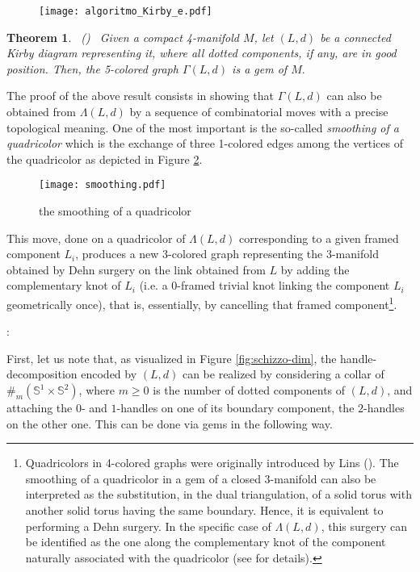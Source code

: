 \documentclass[12pt,a4paper]{article}
\newtheorem{theorem}[lemma]{Theorem}
\newcommand{\G}{\Gamma}
\begin{document}
\begin{figure} [h!]
    \centering
    \texttt{[image: algoritmo\_Kirby\_e.pdf]}
\caption{}
    \label{fig:fishtail_4dim}
\end{figure}

\begin{theorem} \ {\rm (\cite{Casali-Cristofori Kirby-diagrams})} \ \label{t.Kirby-diagram}
Given a compact 4-manifold $M$, let $(L,d)$ be a connected Kirby diagram representing it, where all dotted components, if any, are in good position. Then, the 5-colored graph $\G(L,d)$ is a gem of $M.$  
\end{theorem}

The proof of the above result consists in showing that $\G(L,d)$ can also be obtained from $\Lambda(L,d)$ by a sequence of combinatorial moves with a precise topological meaning.
One of the most important is the so-called {\it smoothing of a quadricolor} which is the exchange of three 1-colored edges among the vertices of the quadricolor as depicted in Figure \ref{fig:smoothing}.

\begin{figure} [h!]
    \centering
    \texttt{[image: smoothing.pdf]}
\caption{the smoothing of a quadricolor}
    \label{fig:smoothing}
\end{figure}

This move, done on a quadricolor of $\Lambda(L,d)$ corresponding to a given framed component $L_i$, produces a new 3-colored graph representing the 3-manifold obtained by Dehn surgery on the link obtained from $L$ by adding the complementary knot of $L_i$ (i.e. a $0$-framed trivial knot linking the component $L_i$ geometrically once), that is, essentially, by cancelling that framed component\footnote{Quadricolors in 4-colored graphs were originally introduced by Lins (\cite{Lins-book}). The smoothing of a quadricolor in a gem of a closed 3-manifold can also be interpreted as the substitution, in the dual triangulation, of a solid torus with another solid torus having the same boundary. Hence, it is equivalent to performing a Dehn surgery. In the specific case of $\Lambda(L,d)$, this surgery can be identified as the one along the complementary knot of the component naturally associated with the quadricolor (see \cite[Proposition 9(i)]{Casali-Cristofori Kirby-diagrams} for details).}.  

\medskip
{}:
\par\noindent
First, let us note that, as visualized in Figure \ref{fig:schizzo-dim}, the handle-decomposition encoded by $(L,d)$ can be realized by considering a collar of $\#_m (\mathbb S^1\times\mathbb S^2)$, where $m\geq 0$ is the number of dotted components of $(L,d)$, and attaching the $0$- and $1$-handles on one of its boundary component, the $2$-handles on the other one.  
This can be done via gems in the following way.
\end{document}
